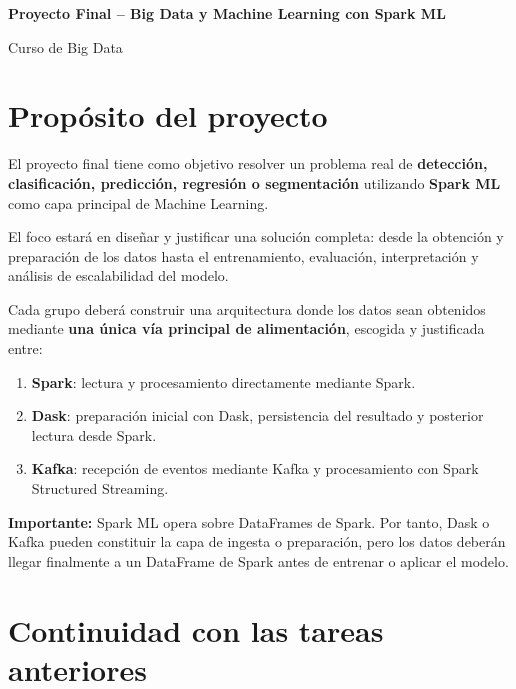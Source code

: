 \documentclass[11pt,a4paper]{article}
\begin{document}
\begin{center}
  \vspace*{0.9cm}
  {\LARGE\bfseries Proyecto Final -- Big Data y Machine Learning con Spark ML\par}
  \vspace{1.1em}
  {\large Curso de Big Data\par}
\end{center}

\vspace{0.5em}

\section{Propósito del proyecto}

El proyecto final tiene como objetivo resolver un problema real de
\textbf{detección, clasificación, predicción, regresión o segmentación} utilizando
\textbf{Spark ML} como capa principal de Machine Learning.

El foco estará en diseñar y justificar una solución completa: desde la obtención y
preparación de los datos hasta el entrenamiento, evaluación, interpretación y análisis de
escalabilidad del modelo.

Cada grupo deberá construir una arquitectura donde los datos sean obtenidos mediante
\textbf{una única vía principal de alimentación}, escogida y justificada entre:

\begin{enumerate}[label=\Alph*., leftmargin=2.3em]
  \item \textbf{Spark}: lectura y procesamiento directamente mediante Spark.
  \item \textbf{Dask}: preparación inicial con Dask, persistencia del resultado y posterior
        lectura desde Spark.
  \item \textbf{Kafka}: recepción de eventos mediante Kafka y procesamiento con Spark
        Structured Streaming.
\end{enumerate}

\textbf{Importante:} Spark ML opera sobre DataFrames de Spark. Por tanto, Dask o Kafka
pueden constituir la capa de ingesta o preparación, pero los datos deberán llegar
finalmente a un DataFrame de Spark antes de entrenar o aplicar el modelo.

\section{Continuidad con las tareas anteriores}
\end{document}
